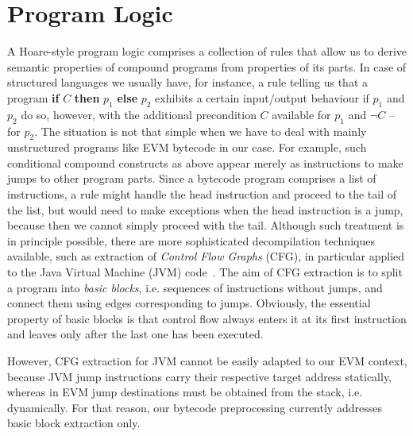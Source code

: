 \documentclass[sigplan,10pt,review]{acmart}\settopmatter{printfolios=true,printccs=false,printacmref=false}
\begin{document}
\section{Program Logic}
\label{sec:logic}
A Hoare-style program logic comprises a collection of rules that allow us to derive semantic properties 
of compound programs from properties of its parts. In case of structured languages 
we usually have, for instance, a rule telling us that a program \textbf{if} $C$ \textbf{then} $p_1$ \textbf{else} $p_2$
exhibits a certain input/output behaviour if $p_1$ and $p_2$ do so, however, with the additional precondition $C$ 
available for $p_1$ and $\neg C$ -- for $p_2$. The situation is not that simple when we have to deal with mainly
unstructured programs like EVM bytecode in our case. For example, such conditional compound constructs as above
appear merely as instructions to make jumps to other program parts. Since a bytecode program comprises
a list of instructions, a rule might handle the head instruction and proceed to the tail of 
the list, but would need to make exceptions when the head instruction is a jump, because then
we cannot simply proceed with the tail. Although such treatment is in principle possible,
there are more sophisticated decompilation techniques available, such as extraction of 
\emph{Control Flow Graphs} (CFG), in particular applied to the Java Virtual Machine (JVM) code~\cite{zhao99}.
The aim of CFG extraction is to split a program into \emph{basic blocks}, i.e. sequences of
instructions without jumps, and connect them
using edges corresponding to jumps. Obviously, the essential property of basic blocks is that
control flow always enters it at its first instruction and leaves only after the last one
has been executed.

However, CFG extraction for JVM cannot be easily adapted to our EVM context, because JVM jump
instructions carry their respective target address statically, whereas in EVM jump destinations
must be obtained from the stack, i.e. dynamically. For that reason, our bytecode preprocessing
currently addresses basic block extraction only.  
%       
\end{document}

